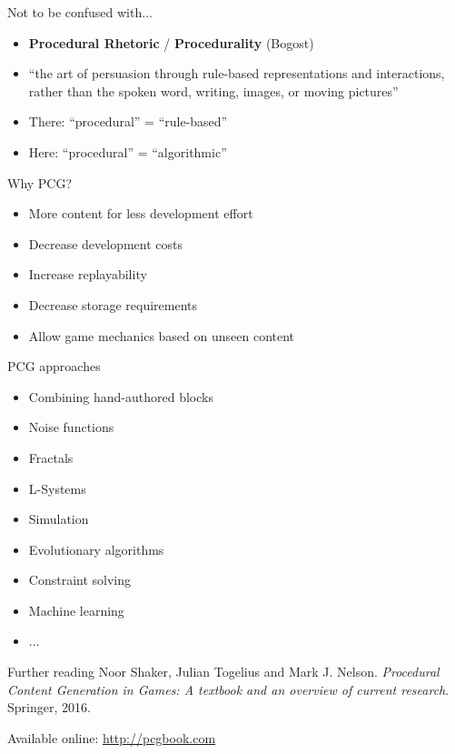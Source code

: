 \begin{frame}{Not to be confused with...}
	\begin{itemize}
		\pause\item \textbf{Procedural Rhetoric} / \textbf{Procedurality} (Bogost)
		\pause\item ``the art of persuasion through rule-based representations and interactions,
			rather than the spoken word, writing, images, or moving pictures''
		\pause\item There: ``procedural'' = ``rule-based''
		\pause\item Here: ``procedural'' = ``algorithmic''
	\end{itemize}
\end{frame}

\begin{frame}{Why PCG?}
	\begin{itemize}
		\pause\item More content for less development effort
		\pause\item Decrease development costs
		\pause\item Increase replayability
		\pause\item Decrease storage requirements
		\pause\item Allow game mechanics based on unseen content
	\end{itemize}
\end{frame}

\begin{frame}{PCG approaches}
	\begin{itemize}
		\pause\item Combining hand-authored blocks
		\pause\item Noise functions
		\pause\item Fractals
		\pause\item L-Systems
		\pause\item Simulation
		\pause\item Evolutionary algorithms
		\pause\item Constraint solving
		\pause\item Machine learning
		\pause\item ...
	\end{itemize}
\end{frame}

\begin{frame}{Further reading}
	Noor Shaker, Julian Togelius and Mark J. Nelson.
	\textit{Procedural Content Generation in Games: A textbook and an overview of current research}.
	Springer, 2016.
	
	Available online: \url{http://pcgbook.com}
\end{frame}
